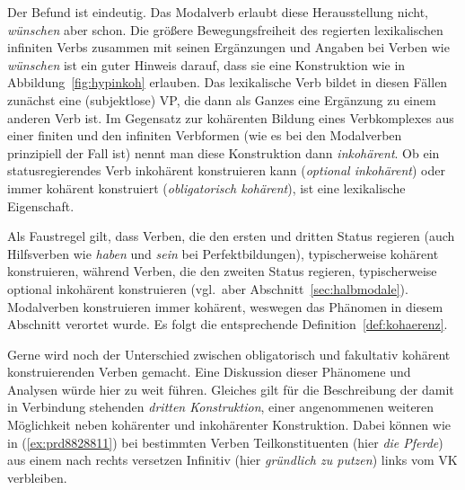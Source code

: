 \begin{exe}
  \ex\label{ex:prd9201} 
  \begin{xlist}
  \end{xlist}
\end{exe}

Der Befund ist eindeutig.
Das Modalverb erlaubt diese Herausstellung nicht, \textit{wünschen} aber schon.
Die größere Bewegungsfreiheit des regierten lexikalischen infiniten Verbs zusammen mit seinen Ergänzungen und Angaben bei Verben wie \textit{wünschen} ist ein guter Hinweis darauf, dass sie eine Konstruktion wie in Abbildung~\ref{fig:hypinkoh} erlauben.
Das lexikalische Verb bildet in diesen Fällen zunächst eine (subjektlose) VP, die dann als Ganzes eine Ergänzung zu einem anderen Verb ist.
Im Gegensatz zur kohärenten Bildung eines Verbkomplexes aus einer finiten und den infiniten Verbformen (wie es bei den Modalverben prinzipiell der Fall ist) nennt man diese Konstruktion dann \textit{inkohärent}.
Ob ein statusregierendes Verb inkohärent konstruieren kann (\textit{optional inkohärent}) oder immer kohärent konstruiert (\textit{obligatorisch kohärent}), ist eine lexikalische Eigenschaft.

Als Faustregel gilt, dass Verben, die den ersten und dritten Status regieren (\zB auch Hilfsverben wie \textit{haben} und \textit{sein} bei Perfektbildungen), typischerweise kohärent konstruieren, während Verben, die den zweiten Status regieren, typischerweise optional inkohärent konstruieren (vgl.\ aber \zB Abschnitt~\ref{sec:halbmodale}).
Modalverben konstruieren immer kohärent, weswegen das Phänomen in diesem Abschnitt verortet wurde.
Es folgt die entsprechende Definition~\ref{def:kohaerenz}.


Gerne wird noch der Unterschied zwischen obligatorisch und fakultativ kohärent konstruierenden Verben gemacht.
Eine Diskussion dieser Phänomene und Analysen würde hier zu weit führen.
Gleiches gilt für die Beschreibung der damit in Verbindung stehenden \textit{dritten Konstruktion}, einer angenommenen weiteren Möglichkeit neben kohärenter und inkohärenter Konstruktion.
Dabei können wie in (\ref{ex:prd8828811}) bei bestimmten Verben Teilkonstituenten (hier \textit{die Pferde}) aus einem nach rechts versetzen Infinitiv (hier \textit{gründlich zu putzen}) links vom VK verbleiben.

